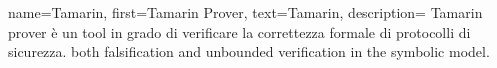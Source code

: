 {
    name={Tamarin},
    first={Tamarin Prover},
    text={Tamarin},
    description={
            Tamarin prover è un tool in grado di verificare la correttezza formale di protocolli di sicurezza.
            both falsification and unbounded verification in the symbolic model.
        }
}
